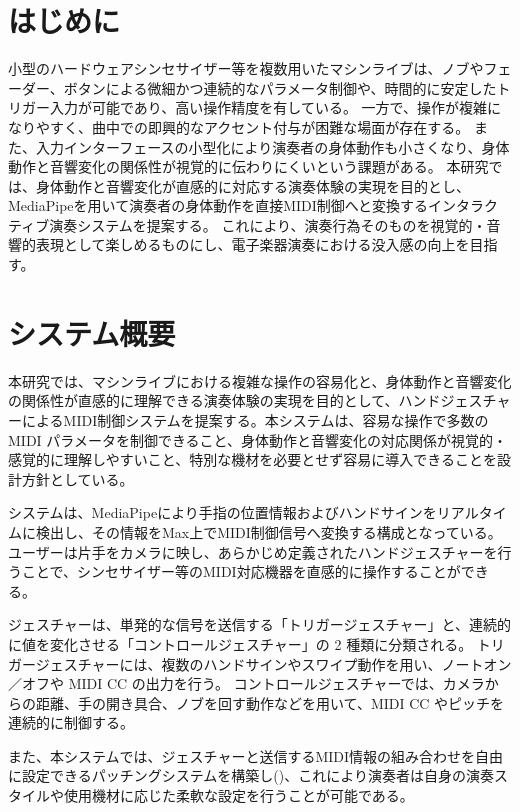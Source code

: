 

\section{はじめに}

小型のハードウェアシンセサイザー等を複数用いたマシンライブは、ノブやフェーダー、ボタンによる微細かつ連続的なパラメータ制御や、時間的に安定したトリガー入力が可能であり、高い操作精度を有している。
一方で、操作が複雑になりやすく、曲中での即興的なアクセント付与が困難な場面が存在する。
また、入力インターフェースの小型化により演奏者の身体動作も小さくなり、身体動作と音響変化の関係性が視覚的に伝わりにくいという課題がある。
本研究では、身体動作と音響変化が直感的に対応する演奏体験の実現を目的とし、MediaPipe\cite{MediaPipe}を用いて演奏者の身体動作を直接MIDI制御へと変換するインタラクティブ演奏システムを提案する。
これにより、演奏行為そのものを視覚的・音響的表現として楽しめるものにし、電子楽器演奏における没入感の向上を目指す。

\section{システム概要}
本研究では、マシンライブにおける複雑な操作の容易化と、身体動作と音響変化の関係性が直感的に理解できる演奏体験の実現を目的として、ハンドジェスチャーによるMIDI制御システムを提案する。本システムは、容易な操作で多数の MIDI パラメータを制御できること、身体動作と音響変化の対応関係が視覚的・感覚的に理解しやすいこと、特別な機材を必要とせず容易に導入できることを設計方針としている。

システムは、MediaPipeにより手指の位置情報およびハンドサインをリアルタイムに検出し、その情報をMax上でMIDI制御信号へ変換する構成となっている。ユーザーは片手をカメラに映し、あらかじめ定義されたハンドジェスチャーを行うことで、シンセサイザー等のMIDI対応機器を直感的に操作することができる。

ジェスチャーは、単発的な信号を送信する「トリガージェスチャー」と、連続的に値を変化させる「コントロールジェスチャー」の 2 種類に分類される。
トリガージェスチャーには、複数のハンドサインやスワイプ動作を用い、ノートオン／オフや MIDI CC の出力を行う。
コントロールジェスチャーでは、カメラからの距離、手の開き具合、ノブを回す動作などを用いて、MIDI CC やピッチを連続的に制御する。

また、本システムでは、ジェスチャーと送信するMIDI情報の組み合わせを自由に設定できるパッチングシステムを構築し()、これにより演奏者は自身の演奏スタイルや使用機材に応じた柔軟な設定を行うことが可能である。

